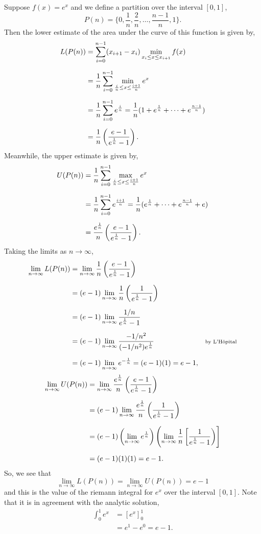 \documentclass[../MathsNotesBase.tex]{subfiles}
\begin{document}
{		
		\bigskip{}
		\begin{exe}
			\item{Suppose ${ f(x) = e^x }$ and we define a partition over the interval $[0,1]$,
				\[ P(n) = \{0, \frac{1}{n}, \frac{2}{n}, \dots, \frac{n-1}{n}, 1\}. \]
				Then the lower estimate of the area under the curve of this function is given by,
				\begin{align*}
					L(P(n)) &= \sum_{i=0}^{n-1} (x_{i+1} - x_i) \min_{ x_i \leq x \leq x_{i+1} }{ f(x) } \nn
					&= \frac{1}{n} \sum_{i=0}^{n-1} \min_{ \frac{i}{n} \leq x \leq \frac{i+1}{n} }{ e^x } \nn
					&= \frac{1}{n} \sum_{i=0}^{n-1} e^{\frac{i}{n}} = \frac{1}{n} (1 + e^{\frac{1}{n}} + \cdots + e^{\frac{n-1}{n}}) \nn
					&= \frac{1}{n} \left( \frac{e - 1}{e^{\frac{1}{n}} - 1} \right).\\
				\end{align*}
				Meanwhile, the upper estimate is given by,
				\begin{align*}
					U(P(n)) &= \frac{1}{n} \sum_{i=0}^{n-1} \max_{ \frac{i}{n} \leq x \leq \frac{i+1}{n} }{ e^x } \nn
					&= \frac{1}{n} \sum_{i=0}^{n-1} e^{\frac{i+1}{n}} = \frac{1}{n} (e^{\frac{1}{n}} + \cdots + e^{\frac{n-1}{n}} + e) \nn
					&= \frac{e^{\frac{1}{n}}}{n} \left( \frac{e - 1}{e^{\frac{1}{n}} - 1} \right).\\
				\end{align*}
				Taking the limits as ${ n \to \infty }$,
				\begin{align*}
					\lim_{n \to \infty} L(P(n)) &= \lim_{n \to \infty} \frac{1}{n} \left( \frac{e - 1}{e^{\frac{1}{n}} - 1} \right) \nn
					&= (e - 1) \lim_{n \to \infty} \frac{1}{n} \left( \frac{1}{e^{\frac{1}{n}} - 1} \right)  &\sidecomment{} \nn
					&= (e - 1) \lim_{n \to \infty} \frac{1/n}{e^{\frac{1}{n}} - 1}  &\sidecomment{} \nn
					&= (e - 1) \lim_{n \to \infty} \frac{-1/n^2}{(-1/n^2)e^{\frac{1}{n}}}  &\sidecomment{by L'H\^{o}pital} \nn
					&= (e - 1) \lim_{n \to \infty} e^{-\frac{1}{n}} = (e - 1)(1) = e - 1,
				\end{align*}
				\begin{align*}
					\lim_{n \to \infty} U(P(n)) &= \lim_{n \to \infty} \frac{e^{\frac{1}{n}}}{n} \left( \frac{e - 1}{e^{\frac{1}{n}} - 1} \right) \nn
					&= (e - 1) \lim_{n \to \infty} \frac{e^{\frac{1}{n}}}{n} \left( \frac{1}{e^{\frac{1}{n}} - 1} \right) \nn
					&= (e - 1) \left( \lim_{n \to \infty} e^{\frac{1}{n}} \right) \left( \lim_{n \to \infty} \frac{1}{n} \left[ \frac{1}{e^{\frac{1}{n}} - 1} \right) \right] \nn
					&= (e - 1) (1) (1) = e - 1. \\
				\end{align*}
				So, we see that 
				\[ \lim_{n \to \infty} L(P(n)) = \lim_{n \to \infty} U(P(n)) = e - 1 \]
				and this is the value of the riemann integral for $e^x$ over the interval $[0,1]$. Note that it is in agreement with the analytic solution,
				\begin{align*}
					\int_0^1 e^x &= [e^x]_0^1 \\
					&= e^1 - e^0 = e - 1.
				\end{align*}
			}
		\end{exe}
		
}
\end{document}
